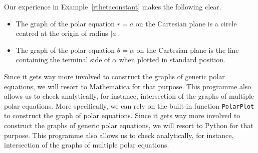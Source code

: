 Our experience in Example~\ref{rthetaconstant} makes the following clear.
\begin{itemize}

\item The graph of the polar equation $r = a$ on the Cartesian plane is a circle centred at the origin of radius $|a|$.

\item The graph of the polar equation $\theta = \alpha$ on the Cartesian plane is the line containing the terminal side of $\alpha$ when plotted in standard position.


\end{itemize}
\ifmathematica
Since it gets way more involved to construct the graphs of generic polar equations, we will resort to Mathematica for that purpose. This programme also allows us to check analytically, for instance,  intersection of the graphs of multiple polar equations. More specifically, we can rely on the built-in function \lstinline{PolarPlot} to construct the graph of polar equations.
\fi
\ifpython
Since it gets way more involved to construct the graphs of generic polar equations, we will resort to Python for that purpose. This programme also allows us to check analytically, for instance,  intersection of the graphs of multiple polar equations.
\fi

